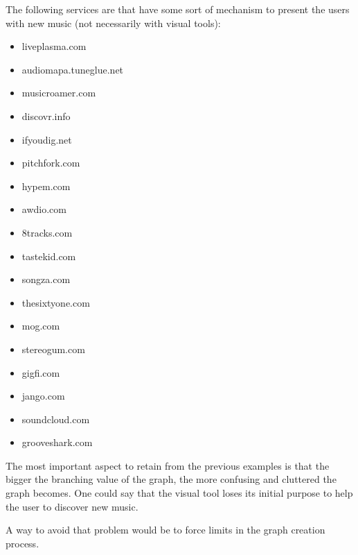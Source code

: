 The following services are that have some sort of mechanism to present the users with new music (not necessarily with visual tools):


\begin{itemize}
  \item liveplasma.com
  \item audiomapa.tuneglue.net
  \item musicroamer.com
  \item discovr.info
  \item ifyoudig.net
  \item pitchfork.com
  \item hypem.com
  \item awdio.com
  \item 8tracks.com
  \item tastekid.com
  \item songza.com
  \item thesixtyone.com
  \item mog.com
  \item stereogum.com
  \item gigfi.com
  \item jango.com
  \item soundcloud.com
  \item grooveshark.com
\end{itemize}


The most important aspect to retain from the previous examples is that the bigger the branching value of the graph, the more confusing and cluttered the graph becomes.
One could say that the visual tool loses its initial purpose to help the user to discover new music.

A way to avoid that problem would be to force limits in the graph creation process.
